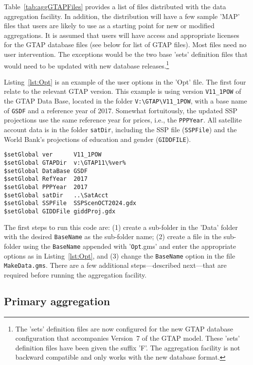 Table~\ref{tab:aggGTAPFiles} provides a list of files distributed with the data
aggregation facility. In addition, the distribution will have a few sample
'MAP' files that users are likely to use as a starting point for new or modified
aggregations. It is assumed that users will have access and appropriate licenses
for the GTAP database files (see below for list of GTAP files). Most files need
no user intervention. The exceptions would be the two base 'sets' definition
files that would need to be updated with new database releases.\footnote{The
'sets' definition files are now configured for the new GTAP database
configuration that accompanies Version~7 of the GTAP model. These 'sets'
definition files have been given the suffix 'F'. The aggregation facility
is not backward compatible and only works with the new database format.}

Listing~\ref{lst:Opt}  is an example of the user options in the 'Opt' file.
The first four relate to the relevant GTAP version. This example
is using version \texttt{V11\_1POW} of the GTAP Data Base, located
in the folder \texttt{V:\textbackslash{}GTAP\textbackslash{V11\_1POW}}, with a base name
of \texttt{GSDF} and a reference year of 2017. Somewhat fortuitously,
the updated SSP projections use the same reference year for prices, i.e.,
the \texttt{PPPYear}. All satellite account data is in the
folder \texttt{satDir}, including the SSP file (\texttt{SSPFile}) and the World Bank's
projections of education and gender (\texttt{GIDDFILE}).

\begin{lstlisting}[language=GAMS, caption={Global options for the workflow}, label=lst:Opt]
$setGlobal ver      V11_1POW
$setGlobal GTAPDir  v:\GTAP11\%ver%
$setGlobal DataBase GSDF
$setGlobal RefYear  2017
$setGlobal PPPYear  2017
$setGlobal satDir   ..\SatAcct
$setGlobal SSPFile  SSPScenOCT2024.gdx
$setGlobal GIDDFile giddProj.gdx
\end{lstlisting}

The first steps to run this code are: (1) create a sub-folder in the 'Data' folder with
the desired \texttt{BaseName} as the sub-folder name; (2) create a file in
the sub-folder using the \texttt{BaseName} appended with '\texttt{Opt}.gms'
and enter the appropriate options as in Listing~\ref{lst:Opt}, and
(3) change the \texttt{BaseName} option in the file \texttt{MakeData.gms}. There
are a few additional steps---described next---that are required before running
the aggregation facility.

\subsection{Primary aggregation}

